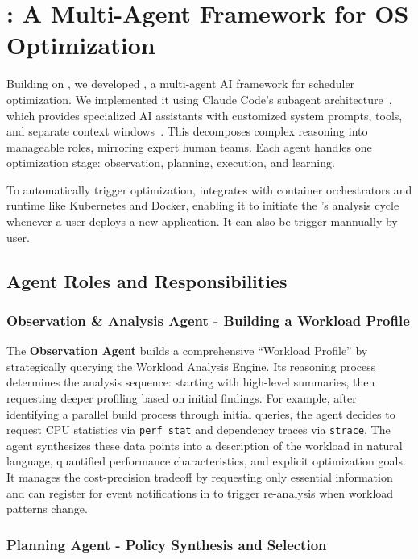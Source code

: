 \section{\agent: A Multi-Agent Framework for OS Optimization}
\label{sec:sched_agents}

Building on \sys, we developed \textbf{\agent}, a multi-agent AI framework for scheduler optimization. We implemented it using Claude Code's subagent architecture~\cite{anthropic2024subagents}, which provides specialized AI assistants with customized system prompts, tools, and separate context windows~\cite{anthropic2024multiagent}. This decomposes complex reasoning into manageable roles, mirroring expert human teams. Each agent handles one optimization stage: observation, planning, execution, and learning. 

To automatically trigger optimization, \sys integrates with container orchestrators and runtime like Kubernetes and Docker, enabling it to initiate the \agent's analysis cycle whenever a user deploys a new application. It can also be trigger mannually by user.

\subsection{Agent Roles and Responsibilities}

\subsubsection{Observation \& Analysis Agent - Building a Workload Profile}

The \textbf{Observation Agent} builds a comprehensive ``Workload Profile'' by strategically querying the Workload Analysis Engine. Its reasoning process determines the analysis sequence: starting with high-level summaries, then requesting deeper profiling based on initial findings. For example, after identifying a parallel build process through initial queries, the agent decides to request CPU statistics via \texttt{perf stat} and dependency traces via \texttt{strace}. The agent synthesizes these data points into a description of the workload in natural language, quantified performance characteristics, and explicit optimization goals. It manages the cost-precision tradeoff by requesting only essential information and can register for event notifications in \sys to trigger re-analysis when workload patterns change.

\subsubsection{Planning Agent - Policy Synthesis and Selection}

